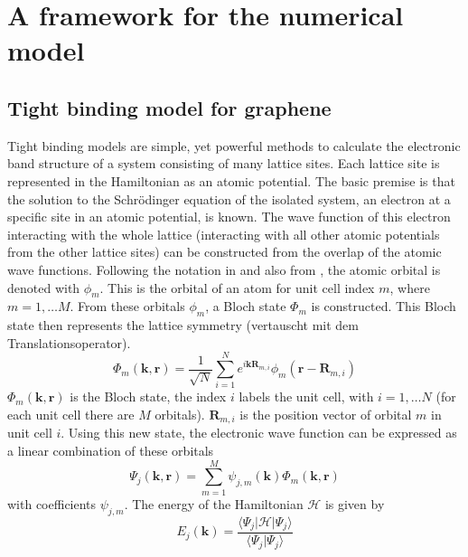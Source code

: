 \chapter{A framework for the numerical model}

\section{Tight binding model for graphene}
Tight binding models are simple, yet powerful methods to calculate the electronic band structure of a system consisting of many lattice sites. Each lattice site is represented in the Hamiltonian as an atomic potential. 
The basic premise is that the solution to the Schr\"odinger equation of the isolated system, an electron at a specific site in an atomic potential, is known. The wave function of this electron interacting with the whole lattice (interacting with all other atomic potentials from the other lattice sites) can be constructed from the overlap of the atomic wave functions. 
Following the notation in \cite{McCann2012} and also from \cite{CastroNeto2009}, the atomic orbital is denoted with $\phi_m$. This is the orbital of an atom for unit cell index $m$, where $m = 1, \dots M$. From these orbitals $\phi_m$, a Bloch state $\Phi_m$ is constructed. This Bloch state then represents the lattice symmetry (vertauscht mit dem Translationsoperator).
\begin{equation}
\Phi_m \left( \mathbf{k}, \mathbf{r} \right) = \frac{1}{\sqrt{N}} \sum_{i = 1}^N e^{i \mathbf{k} \mathbf{R}_{m, i}} \phi _m \left( \mathbf{r} - \mathbf{R}_{m, i} \right)
\end{equation}
$\Phi_m \left( \mathbf{k}, \mathbf{r} \right)$ is the Bloch state, the index $i$ labels the unit cell, with $i = 1, \dots N$ (for each unit cell there are $M$ orbitals). $\mathbf{R}_{m, i}$ is the position vector of orbital $m$ in unit cell $i$. Using this new state, the electronic wave function can be expressed as a linear combination of these orbitals
\begin{equation}
\Psi_j \left( \mathbf{k}, \mathbf{r} \right) = \sum_{m=1}^M \psi_{j, m} \left( \mathbf{k} \right) \Phi_m \left( \mathbf{k}, \mathbf{r} \right) 
\end{equation}
with coefficients $\psi_{j, m}$.
The energy of the Hamiltonian $\mathcal{H}$ is given by 
\begin{equation}
E_j \left( \mathbf{k} \right) = \frac{\langle \Psi_j| \mathcal{H} | \Psi_j \rangle}{\langle \Psi_j | \Psi_j \rangle}
\end{equation}
